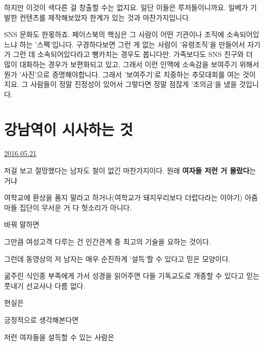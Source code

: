 하지만 이것이 색다른 걸 창출할 수는 없지요. 일단 이들은 루저들이니까요.
일베가 기발한 컨텐츠를 제작해보았자 한계가 있는 것과 마찬가지입니다.
\vspace{5mm}

SNS 문화도 한몫하죠.
페이스북의 핵심은 그 사람이 어떤 기관이나 조직에 소속되어있느냐 하는 '스펙'입니다.
구경하다보면 그런 게 없는 사람이 '유령조직'을 만들어서 자기가 그런 데 소속되어있다라고 뻥카치는 경우도 봅니다만.
가족보다도 SNS 친구와 더 많이 대화하는 경우가 보편화되고 있고, 그래서 이런 인맥에 소속감을 보여주기 위해서
뭔가 '사진'으로 증명해야합니다. 그래서 '보여주기'로 치중하는 추모대회를 여는 것이지요.
그 사람들이 정말 진정성이 있어서 그렇다면 정말 점잖게 '조의금'을 냈을 것입니다.
\vspace{5mm}






\section{강남역이 시사하는 것}
\href{https://www.kockoc.com/Apoc/786600}{2016.05.21}

\vspace{5mm}

저걸 보고 절망했다는 남자도 철이 없긴 마찬가지이다. 원래 \textbf{여자들 저런 거 몰랐다}는 거냐
\vspace{5mm}

여학교에 환상을 품지 말라고 하거나(여학교가 돼지우리보다 더럽다라는 이야기) 아줌마들 집단이 무서운 거 다 헛소리가 아니다.
\vspace{5mm}

바꿔 말하면
\vspace{5mm}

그만큼 여성고객 다루는 건 인간관계 중 최고의 기술을 요하는 것이다.
\vspace{5mm}

그런데 동영상의 저 남자는 매우 순진하게 '설득'할 수 있다고 믿은 모양이다.
\vspace{5mm}

굶주린 식인종 부족에게 가서 성경을 읽어주면 다들 기독교도로 개종할 수 있다고 믿는 풋내기 선교사나 다름 없다.
\vspace{5mm}

현실은
\vspace{5mm}

긍정적으로 생각해본다면
\vspace{5mm}

저런 여자들을 설득할 수 있는 사람은
\vspace{5mm}

